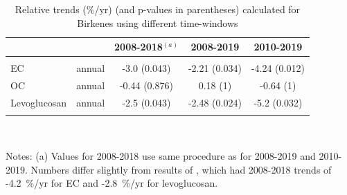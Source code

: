 \begin{table}[H]
\centering
\parbox{11.9cm}{
\caption{Relative trends (\%/yr) (and p-values in parentheses) calculated for Birkenes 
    using different time-windows \label{tab:BirkenesTrends}}}
\begin{tabular}{lcccc}
\toprule
     &         & 2008-2018$^{(a)}$& 2008-2019     & 2010-2019       \\
\midrule
 & & & & \\
EC   & annual  & -3.0 (0.043)        &  -2.21 (0.034)   & -4.24 (0.012) \\
OC   & annual  &  -0.44 (0.876)      &   0.18 (1)     & -0.64 (1)   \\
Levoglucosan & annual  & -2.5 (0.043)        &  -2.48 (0.024)   & -5.2  (0.032) \\
& & & & \\
\bottomrule 
\end{tabular}\\
\parbox{11.9cm}{

Notes:
(a) Values for 2008-2018 use same procedure as for 2008-2019 and 2010-2019. Numbers
differ slightly from results of \citet{Yttri2021}, which had 2008-2018 trends of -4.2~\%/yr for EC and -2.8~\%/yr for levoglucosan.\\
\\
}
\end{table}


